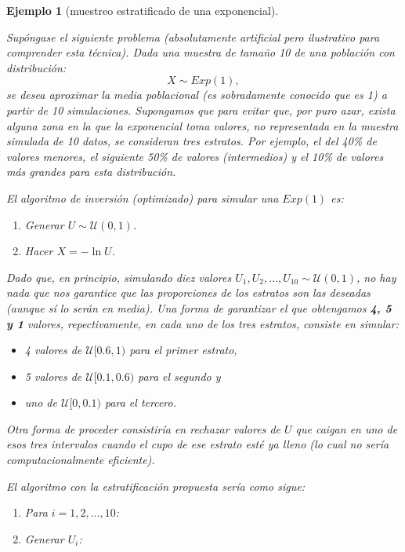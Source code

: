 \documentclass[
]{book}
\theoremstyle{break}
\newtheorem{example}{Ejemplo}[chapter]
\theoremstyle{nonumberplain}
\begin{document}
\begin{example}[muestreo estratificado de una exponencial]
\protect\hypertarget{exm:estr-exp}{}\label{exm:estr-exp}

Supóngase el siguiente problema (absolutamente artificial pero ilustrativo para comprender esta técnica).
Dada una muestra de tamaño 10 de una población con distribución:
\[X \sim Exp\left( 1 \right),\]
se desea aproximar la media poblacional (es sobradamente conocido que es 1) a partir de 10 simulaciones.
Supongamos que para evitar que, por puro azar, exista alguna zona en la que la exponencial toma valores, no representada en la muestra simulada de 10 datos, se consideran tres estratos.
Por ejemplo, el del 40\% de valores menores, el siguiente 50\% de valores (intermedios) y el 10\% de valores más grandes para esta distribución.

El algoritmo de inversión (optimizado) para simular una \(Exp\left(1\right)\) es:

\begin{enumerate}
\def\labelenumi{\arabic{enumi}.}
\item
  Generar \(U\sim \mathcal{U}\left( 0,1\right)\).
\item
  Hacer \(X=-\ln U\).
\end{enumerate}

Dado que, en principio, simulando diez valores \(U_{1},U_{2},\ldots,U_{10}\sim \mathcal{U}\left( 0,1\right)\), no hay nada que nos garantice que las proporciones de los estratos son las deseadas (aunque sí lo serán en media).
Una forma de garantizar el que obtengamos \textbf{4, 5 y 1} valores, repectivamente, en cada uno de los tres estratos, consiste en simular:

\begin{itemize}
\item
  4 valores de \(\mathcal{U}[0.6,1)\) para el primer estrato,
\item
  5 valores de \(\mathcal{U}[0.1,0.6)\) para el segundo y
\item
  uno de \(\mathcal{U}[0,0.1)\) para el tercero.
\end{itemize}

Otra forma de proceder consistiría en rechazar valores de \(U\) que caigan en uno de esos tres intervalos cuando el cupo de ese estrato esté ya lleno (lo cual no sería computacionalmente eficiente).

El algoritmo con la estratificación propuesta sería como sigue:

\begin{enumerate}
\def\labelenumi{\arabic{enumi}.}
\item
  Para \(i=1,2,\ldots, 10\):
\item
  Generar \(U_{i}\):


\end{enumerate}
\end{example}
\end{document}
